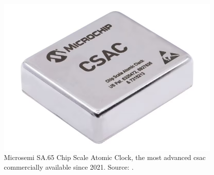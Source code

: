 \begin{figure}[H]
    \centering
    \includegraphics[width=.6\textwidth, max width=.8\linewidth]{img/microsemi-SA65.png}
    \caption{
        Microsemi SA.65 Chip Scale Atomic Clock, the most advanced \acrshort{csac} commercially available since 2021.
        Source: \cite{MICROCHIP}.
    }
    \label{fig:microsemi_SA65}
\end{figure}